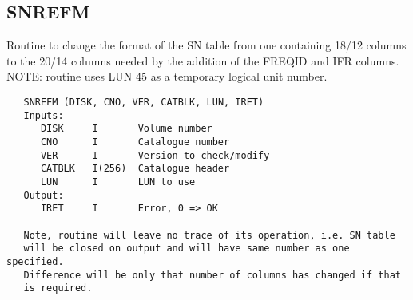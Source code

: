 \subsection{SNREFM}
Routine to change the format of the SN table from one containing
18/12 columns to the 20/14 columns needed by the addition of the
FREQID and IFR columns.
NOTE: routine uses LUN 45 as a temporary logical unit number.
\begin{verbatim}
   SNREFM (DISK, CNO, VER, CATBLK, LUN, IRET)
   Inputs:
      DISK     I       Volume number
      CNO      I       Catalogue number
      VER      I       Version to check/modify
      CATBLK   I(256)  Catalogue header
      LUN      I       LUN to use
   Output:
      IRET     I       Error, 0 => OK

   Note, routine will leave no trace of its operation, i.e. SN table
   will be closed on output and will have same number as one specified.
   Difference will be only that number of columns has changed if that
   is required.
\end{verbatim}

